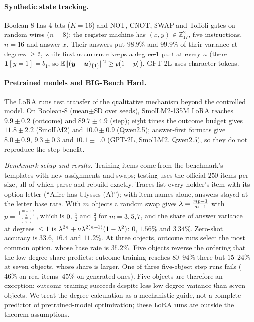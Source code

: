 \paragraph{Synthetic state tracking.} Boolean-8 has $4$ bits ($K=16$) and NOT, CNOT, SWAP and Toffoli gates on random wires ($n=8$); the register
machine has $(x,y)\in\mathbb Z_{17}^2$, five instructions, $n=16$ and answer $x$. Their answers put $98.9\%$ and $99.9\%$ of their
variance at degrees $\ge2$, while first occurrence keeps a degree-$1$ part at every $n$ (there $\mathbf 1[y=1]=b_1$, so $\mathbb E\|(\bm y-\bm u)_{\{1\}}\|^2\ge p(1-p)$). GPT-2L uses character tokens. \paragraph{Pretrained models and BIG-Bench Hard.} The LoRA runs test transfer of the qualitative mechanism beyond the controlled model.
On Boolean-8 (mean$\pm$SD over seeds), SmolLM2-135M LoRA reaches $9.9\pm0.2$ (outcome)
and $89.7\pm4.9$ (step); eight times the outcome budget gives $11.8\pm2.2$ (SmolLM2) and $10.0\pm0.9$ (Qwen2.5); answer-first
formats give $8.0\pm0.9$, $9.3\pm0.3$ and $10.1\pm1.0$ (GPT-2L, SmolLM2, Qwen2.5), so they do not reproduce the step benefit.



\noindent\begin{minipage}{\linewidth}
\emph{Benchmark setup and results.} Training items come from the benchmark's templates with new assignments and swaps; testing uses
the official $250$ items per size, all of which parse and rebuild exactly. Traces list every holder's item with its
option letter (``Alice has Ulysses (A)''); with item names alone, answers stayed at the letter base rate. With $m$
objects a random swap gives $\lambda=\frac{mp-1}{m-1}$ with $p=\frac{\binom{m-1}{2}}{\binom{m}{2}}$, which is $0$, $\tfrac{1}{2}$ and $\tfrac{2}{3}$ for $m=3,5,7$, and the
share of answer variance at degrees $\le1$ is $\lambda^{2n}+n\lambda^{2(n-1)}(1-\lambda^2)$: $0$, $1.56\%$ and $3.34\%$. Zero-shot accuracy is
$33.6$, $16.4$ and $11.2\%$. At three objects, outcome runs select the most common option, whose base rate is $35.2\%$.
Five objects reverse the ordering that the low-degree share predicts: outcome training reaches $80$--$94\%$ there but
$15$--$24\%$ at seven objects, whose share is larger. One of three five-object step runs fails ($46\%$ on real items, $45\%$ on
generated ones). Five objects are therefore an exception: outcome training succeeds despite less low-degree variance than seven objects.
We treat the degree calculation as a mechanistic guide, not a complete predictor of pretrained-model optimization; these LoRA runs are outside the theorem assumptions.
\end{minipage}





